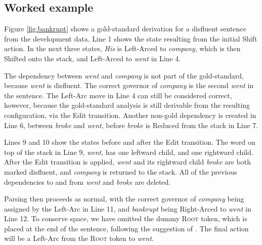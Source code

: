 \documentclass[11pt,letterpaper]{article}
\begin{document}
\subsection{Worked example}

Figure \ref{fig:bankrupt} shows a gold-standard derivation for a disfluent sentence
from the development data.
Line 1 shows the state resulting from the initial Shift action.  In the next three
states, \emph{His} is Left-Arced to \emph{company}, which is then Shifted onto
the stack, and Left-Arced to \emph{went} in Line 4.

The dependency between \emph{went} and \emph{company} is not part of the gold-standard,
because \emph{went} is disfluent.  The correct governor of \emph{company} is the
second \emph{went} in the sentence.  The Left-Arc move in Line 4 can still
be considered correct, however, because the gold-standard analysis is still
derivable from the resulting configuration, via the Edit transition.
Another non-gold dependency is created in Line 6, between \emph{broke} and \emph{went},
before \emph{broke} is Reduced from the stack in Line 7.

Lines 9 and 10 show the states before and after the Edit transition. The word
on top of the stack in Line 9, \emph{went}, has one leftward child, and one
rightward child.  After the Edit transition is applied, \emph{went} and its 
rightward child \emph{broke} are both marked disfluent, and \emph{company}
is returned to the stack.  All of the previous dependencies to and from \emph{went}
and \emph{broke} are deleted.

Parsing then proceeds as normal, with the correct governor of \emph{company}
being assigned by the Left-Arc in Line 11, and \emph{bankrupt} being Right-Arced
to \emph{went} in Line 12.  To conserve space, we have omitted the dummy
\textsc{Root} token, which is placed at the end of the sentence, following
the suggestion of \citet{nivre:squib}.  The final action will be a Left-Arc
from the \textsc{Root} token to \emph{went}.
\end{document}
